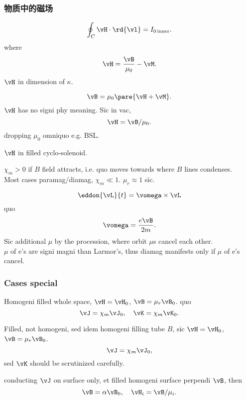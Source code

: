 \documentclass{ctexart}
\begin{document}
\subsubsection{物质中的磁场} %
\label{ssub:物质中的磁场}

\begin{finale}
	\begin{theorem}
		\[ \oint_C \vH\cdot\rd{\vl} = I_{0\,\mathrm{inner}}. \]
		where
		\[ \vH = \frac{\vB}{\mu_0} - \vM. \]
		$\vH$ in dimension of $\kappa$.
	\end{theorem}
\end{finale}
\[ \vB = \mu_0\pare{\vH + \vM}. \]
$\vH$ has no signi phy meaning. S\=ic in vac,
\[ \vH = \vB/\mu_0. \]
dropping $\mu_0$ omniquo e.g. BSL.
\begin{ex}
	$\vH$ in filled cyclo-solenoid.
\end{ex}
$\chi_m>0$ if $B$ field attracts, i.e. quo moves towards where $B$ lines condenses.\\
Most cases paramag/diamag, $\chi_m\ll 1$. $\mu_r\approx 1$ s\=ic.

\begin{ex}
	\[ \eddon{\vL}{t} = \vomega \times \vL \]
	quo
	\[ \vomega = \frac{e\vB}{2m}. \]
	S\=ic additional $\mu$ by the procession, where orbit $\mu$s cancel each other.\\
	$\mu$ of e's are signi magni than Larmor's, thus diamag manifests only if $\mu$ of e's cancel.
\end{ex}


\subsubsection{Cases special} %
\label{ssub:cases_special}

\begin{ex}
	Homogeni filled whole space, $\vH = \vH_0$, $\vB = \mu_r \vB_0$. quo
	\[ \vJ = \chi_m \vJ_0,\quad \vK = \chi_m\vK_0. \]
\end{ex}
\begin{ex}
	Filled, not homogeni, sed idem homogeni filling tube $B$, s\=ic $\vH = \vH_0$, $\vB = \mu_r\vB_0$.
	\[ \vJ = \chi_m \vJ_0, \]
	sed $\vK$ should be scrutinized carefully.
\end{ex}
\begin{ex}
	conducting $\vJ$ on surface only, et filled homogeni surface perpendi $\vB$, then
	\[ \vB = \alpha \vB_0,\quad \vH_i = \vB/\mu_i. \]
\end{ex}


\end{document}

